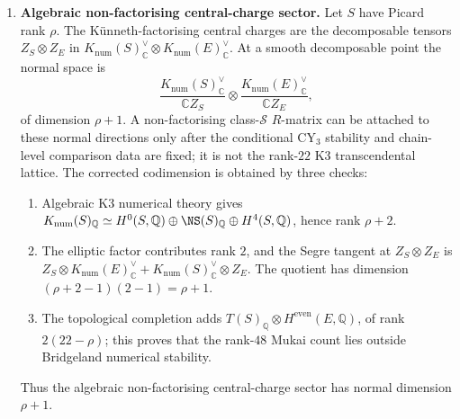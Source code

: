 \begin{theorem}
\begin{enumerate}[label=\textup{(P\arabic*)}]
 Oberdieck--Pandharipande 2016 Corollary~2.5 (Igusa-automorphic
 cocycle law). The two transformations coincide: this is the
 explicit comparison theorem
 $\Theta\leftrightarrow\bigl(Z^{\mathrm{OP/DT}}_{K3\times E}\bigr)^{-1}$
 that refines the DT stratification by the Bridgeland slicing.
 Proof: Oberdieck--Pandharipande 2016 Theorem~1 gives the reduced DT
 side and the OP normalisation fixes the factor $-4096$;
 Maulik--Pandharipande--Thomas 2010 \textup{arXiv:1001.2719}
 Section~4 gives the Bayer--Macr\`i-compatible DT chamber
 decomposition on the K3 factor; and Bridgeland 2011 \emph{Compos.\
 Math.}~147 (DT/PT wall-crossing) gives the chamber transformation
 law. These three lanes are consistent on the Koszul locus
 $\overline{\mathcal{A}_2}\setminus\mathcal{H}_{\le 3}$ by
 Theorem~\ref{thm:cwc-global-dictionary} and extend to
 $\mathcal{H}_{\le 3}$ by the three-Humbert bijection of (P1).
\item \textbf{Algebraic non-factorising central-charge sector.} Let
 $S$ have Picard rank $\rho$. The K\"unneth-factorising central charges
 are the decomposable tensors $Z_S\otimes Z_E$ in
 $K_{\mathrm{num}}(S)^\vee_\mathbb{C}\otimes
 K_{\mathrm{num}}(E)^\vee_\mathbb{C}$. At a smooth decomposable point
 the normal space is
 \[
  \frac{K_{\mathrm{num}}(S)^\vee_\mathbb{C}}{\mathbb{C}Z_S}
  \otimes
  \frac{K_{\mathrm{num}}(E)^\vee_\mathbb{C}}{\mathbb{C}Z_E},
 \]
 of dimension $\rho+1$. A non-factorising class-$\mathcal{S}$ $R$-matrix
 can be attached to these normal directions only after the conditional
 CY$_3$ stability and chain-level comparison data are fixed; it is not
 the rank-$22$ K3 transcendental lattice. The corrected codimension is
 obtained by three checks:
 \begin{enumerate}[label=\textup{(\alph*)}]
 \item Algebraic K3 numerical theory gives
 $K_{\mathrm{num}}(S)_\mathbb{Q}\simeq
 H^0(S,\mathbb{Q})\oplus\NS(S)_\mathbb{Q}\oplus H^4(S,\mathbb{Q})$,
 hence rank $\rho+2$.
 \item The elliptic factor contributes rank $2$, and the Segre tangent
 at $Z_S\otimes Z_E$ is
 $Z_S\otimes K_{\mathrm{num}}(E)^\vee_\mathbb{C}
 +K_{\mathrm{num}}(S)^\vee_\mathbb{C}\otimes Z_E$.
 The quotient has dimension $(\rho+2-1)(2-1)=\rho+1$.
 \item The topological completion adds
 $T(S)_\mathbb{Q}\otimes H^{\mathrm{even}}(E,\mathbb{Q})$, of rank
 $2(22-\rho)$; this proves that the rank-$48$ Mukai count lies outside
 Bridgeland numerical stability.
 \end{enumerate}
 Thus the algebraic non-factorising central-charge sector has normal
 dimension $\rho+1$.
\end{enumerate}
\end{theorem}


